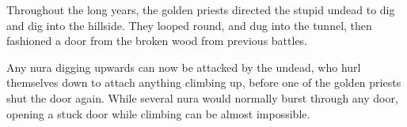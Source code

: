 \begin{multicols}{2}
\begin{exampletext}
	Throughout the long years, the golden priests directed the stupid undead to dig and dig into the hillside.
	They looped round, and dug into the tunnel, then fashioned a door from the broken wood from previous battles.

Any nura digging upwards can now be attacked by the undead, who hurl themselves down to attach anything climbing up, before one of the golden priests shut the door again.
While several nura would normally burst through any door, opening a stuck door while climbing can be almost impossible.

\end{exampletext}

\end{multicols}

